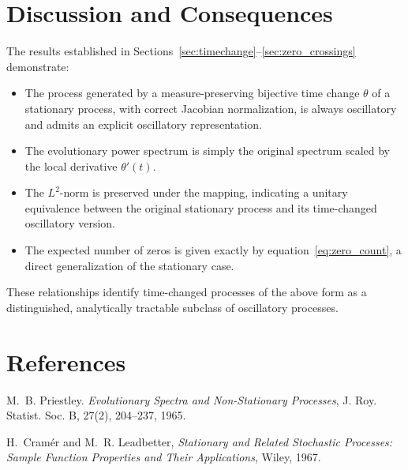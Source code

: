 \documentclass[12pt]{article}
\begin{document}
\section{Discussion and Consequences}\label{sec:discussion}

The results established in Sections~\ref{sec:timechange}--\ref{sec:zero_crossings} demonstrate:
\begin{itemize}
    \item The process generated by a measure-preserving bijective time change $\theta$ of a stationary process, with correct Jacobian normalization, is always oscillatory and admits an explicit oscillatory representation.
    \item The evolutionary power spectrum is simply the original spectrum scaled by the local derivative $\theta'(t)$.
    \item The $L^2$-norm is preserved under the mapping, indicating a unitary equivalence between the original stationary process and its time-changed oscillatory version.
    \item The expected number of zeros is given exactly by equation~\eqref{eq:zero_count}, a direct generalization of the stationary case.
\end{itemize}

These relationships identify time-changed processes of the above form as a distinguished, analytically tractable subclass of oscillatory processes.

\section{References}\label{sec:references}

\begin{thebibliography}{99}
      M.~B. Priestley. \textit{Evolutionary Spectra and Non-Stationary Processes}, J. Roy. Statist. Soc. B, 27(2), 204--237, 1965.

      H.~Cramér and M.~R. Leadbetter, \textit{Stationary and Related Stochastic Processes: Sample Function Properties and Their Applications}, Wiley, 1967.
\end{thebibliography}
\end{document}
